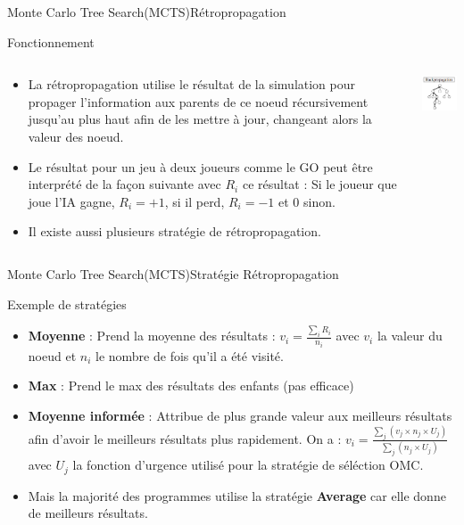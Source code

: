 \begin{frame}{Monte Carlo Tree Search(MCTS)}{Rétropropagation}
	\begin{block}{Fonctionnement}
		\begin{columns}
			\begin{column}{8cm}
				\begin{itemize}
					\item La rétropropagation utilise le résultat de la simulation pour propager l'information aux parents de ce noeud récursivement jusqu'au plus haut afin de les mettre à jour, changeant alors la valeur des noeud. 
					\item Le résultat pour un jeu à deux joueurs comme le GO peut être interprété de la façon suivante avec $R_{i}$ ce résultat : Si le joueur que joue l'IA gagne, $R_{i} = +1$, si il perd, $R_{i} = -1$ et $0$ sinon.
					\item Il existe aussi plusieurs stratégie de rétropropagation.
				\end{itemize}
			\end{column}
			\begin{column}{4cm}
				\includegraphics[width=3cm]{ressources/Backpropagation.png}
			\end{column}
		\end{columns}
	\end{block}
\end{frame}

\begin{frame}{Monte Carlo Tree Search(MCTS)}{Stratégie Rétropropagation}
	\begin{block}{Exemple de stratégies}
		\begin{itemize}
			\item \textbf{Moyenne} : Prend la moyenne des résultats : $v_{i} = \frac{\sum_{i}^{}R_{i}}{n_{i}}$ avec $v_{i}$ la valeur du noeud et $n_i$ le nombre de fois qu'il a été visité.
			\item \textbf{Max} : Prend le max des résultats des enfants (pas efficace)
			\item \textbf{Moyenne informée} : Attribue de plus grande valeur aux meilleurs résultats afin d'avoir le meilleurs résultats plus rapidement.
			On a : $v_{i} = \frac{\sum_{j}^{}(v_{j}\times n_{j}\times U_{j})}{\sum_{j}^{}(n_{j}\times U_{j})}$ avec $U_{j}$ la fonction d'urgence utilisé pour la stratégie de séléction OMC.
			\item Mais la majorité des programmes utilise la stratégie \textbf{Average} car elle donne de meilleurs résultats.
		\end{itemize}
	\end{block}
\end{frame}

